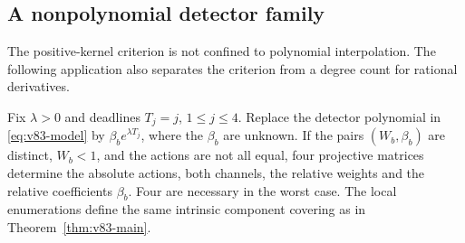 \subsection{A nonpolynomial detector family}

The positive-kernel criterion is not confined to polynomial interpolation.
The following application also separates the criterion from a degree
count for rational derivatives.

\begin{proposition}\label{prop:v83-exponential}
Fix $\lambda>0$ and deadlines $T_j=j$, $1\le j\le4$.
Replace the detector polynomial in \eqref{eq:v83-model} by
$\beta_b e^{\lambda T_j}$, where the $\beta_b$ are unknown.
If the pairs $(W_b,\beta_b)$ are distinct, $W_b<1$, and the
actions are not all equal, four projective matrices determine the
absolute actions, both channels, the relative weights and the relative
coefficients $\beta_b$. Four are necessary in the worst case.
The local enumerations define the same intrinsic component covering
as in Theorem~\ref{thm:v83-main}.
\end{proposition}
